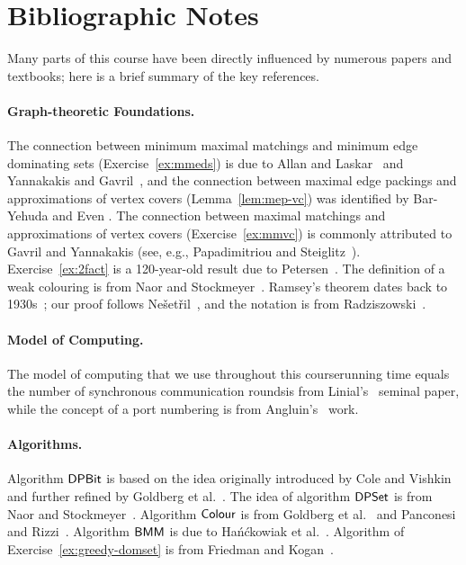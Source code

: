 \section{Bibliographic Notes}

Many parts of this course have been directly influenced by numerous papers and textbooks; here is a brief summary of the key references.

\paragraph{Graph-theoretic Foundations.}

The connection between minimum maximal matchings and minimum edge dominating sets (Exercise~\ref{ex:mmeds}) is due to Allan and Laskar~\cite{allan78domination} and Yannakakis and Gavril~\cite{yannakakis80edge}, and the connection between maximal edge packings and approximations of vertex covers (Lemma~\ref{lem:mep-vc}) was identified by Bar-Yehuda and Even \cite{bar-yehuda81linear-time}. The connection between maximal matchings and approximations of vertex covers (Exercise~\ref{ex:mmvc}) is commonly attributed to Gavril and Yannakakis (see, e.g., Papadimitriou and Steiglitz~\cite{papadimitriou98combinatorial}). Exercise~\ref{ex:2fact} is a 120-year-old result due to Petersen~\cite{petersen1891dietheorie}. The definition of a weak colouring is from Naor and Stockmeyer~\cite{naor95what}. Ramsey's theorem dates back to 1930s~\cite{ramsey30problem}; our proof follows Ne{\v s}et{\v r}il~\cite{nesetril95ramsey}, and the notation is from Radziszowski~\cite{radziszowski11ramsey}.

\paragraph{Model of Computing.}

The model of computing that we use throughout this course\mydash running time equals the number of synchronous communication rounds\mydash is from Linial's~\cite{linial92locality} seminal paper, while the concept of a port numbering is from Angluin's~\cite{angluin80local} work.

\paragraph{Algorithms.}

Algorithm $\textsf{DPBit}$ is based on the idea originally introduced by Cole and Vishkin~\cite{cole86deterministic} and further refined by Goldberg et al.~\cite{goldberg88parallel}. The idea of algorithm $\textsf{DPSet}$ is from Naor and Stockmeyer~\cite{naor95what}. Algorithm $\textsf{Colour}$ is from Goldberg et al.~\cite{goldberg88parallel} and Panconesi and Rizzi~\cite{panconesi01some}. Algorithm $\textsf{BMM}$ is due to Ha\'{n}\'{c}kowiak et al.~\cite{hanckowiak98distributed}. Algorithm of Exercise~\ref{ex:greedy-domset} is from Friedman and Kogan~\cite{friedman11deterministic}.

